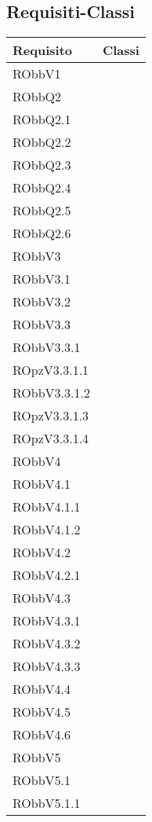 \documentclass[../DefinizioneDiProdotto.tex]{subfiles}
\begin{document}
	\subsection{Requisiti-Classi}
\begin{longtabu} to \textwidth {X[-2cm] X}
\toprule
\textbf{Requisito} & \textbf{Classi}\\
\midrule
\endhead
{}
RObbV1 &  \\ 
\midrule 
RObbQ2 &  \\ 
\midrule 
RObbQ2.1 &  \\ 
\midrule 
RObbQ2.2 &  \\ 
\midrule 
RObbQ2.3 &  \\ 
\midrule 
RObbQ2.4 &  \\ 
\midrule 
RObbQ2.5 &  \\ 
\midrule 
RObbQ2.6 &  \\ 
\midrule 
RObbV3 &  \\ 
\midrule 
RObbV3.1 &  \\ 
\midrule 
RObbV3.2 &  \\ 
\midrule 
RObbV3.3 &  \\ 
\midrule 
RObbV3.3.1 &  \\ 
\midrule 
ROpzV3.3.1.1 &  \\ 
\midrule 
RObbV3.3.1.2 &  \\ 
\midrule 
ROpzV3.3.1.3 &  \\ 
\midrule 
ROpzV3.3.1.4 &  \\ 
\midrule 
RObbV4 &  \\ 
\midrule 
RObbV4.1 &  \\ 
\midrule 
RObbV4.1.1 &  \\ 
\midrule 
RObbV4.1.2 &  \\ 
\midrule 
RObbV4.2 &  \\ 
\midrule 
RObbV4.2.1 &  \\ 
\midrule 
RObbV4.3 &  \\ 
\midrule 
RObbV4.3.1 &  \\ 
\midrule 
RObbV4.3.2 &  \\ 
\midrule 
RObbV4.3.3 &  \\ 
\midrule 
RObbV4.4 &  \\ 
\midrule 
RObbV4.5 &  \\ 
\midrule 
RObbV4.6 &  \\ 
\midrule 
RObbV5 &  \\ 
\midrule 
RObbV5.1 &  \\ 
\midrule 
RObbV5.1.1 &  \\ 
\midrule 

\end{longtabu}
\end{document}
